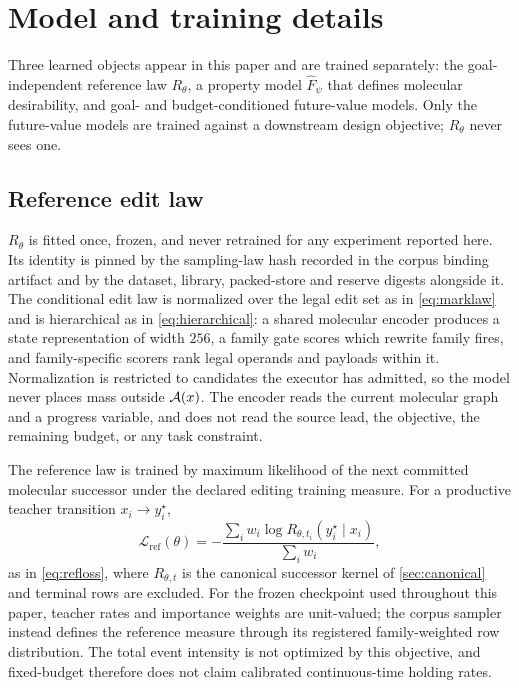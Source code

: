 \section{Model and training details}
\label{app:models}

Three learned objects appear in this paper and are trained separately: the goal-independent reference law $R_\theta$, a property model $\widehat F_\psi$ that defines molecular desirability, and goal- and budget-conditioned future-value models. Only the future-value models are trained against a downstream design objective; $R_\theta$ never sees one.

\subsection{Reference edit law}

$R_\theta$ is fitted once, frozen, and never retrained for any experiment reported here. Its identity is pinned by the sampling-law hash recorded in the corpus binding artifact and by the dataset, library, packed-store and reserve digests alongside it. The conditional edit law is normalized over the legal edit set as in \eqref{eq:marklaw} and is hierarchical as in \eqref{eq:hierarchical}: a shared molecular encoder produces a state representation of width $256$, a family gate scores which rewrite family fires, and family-specific scorers rank legal operands and payloads within it. Normalization is restricted to candidates the executor has admitted, so the model never places mass outside $\mathcal{A}(x)$. The encoder reads the current molecular graph and a progress variable, and does not read the source lead, the objective, the remaining budget, or any task constraint.

The reference law is trained by maximum likelihood of the next committed molecular successor under the declared editing training measure. For a productive teacher transition $x_i\rightarrow y^{\star}_i$,
\begin{equation*}
\mathcal{L}_{\mathrm{ref}}(\theta)=-\frac{\sum_i w_i\log R_{\theta,t_i}(y^{\star}_i\mid x_i)}{\sum_i w_i},
\end{equation*}
as in \eqref{eq:refloss}, where $R_{\theta,t}$ is the canonical successor kernel of \cref{sec:canonical} and terminal rows are excluded. For the frozen checkpoint used throughout this paper, teacher rates and importance weights are unit-valued; the corpus sampler instead defines the reference measure through its registered family-weighted row distribution. The total event intensity is not optimized by this objective, and fixed-budget \method{} therefore does not claim calibrated continuous-time holding rates.

